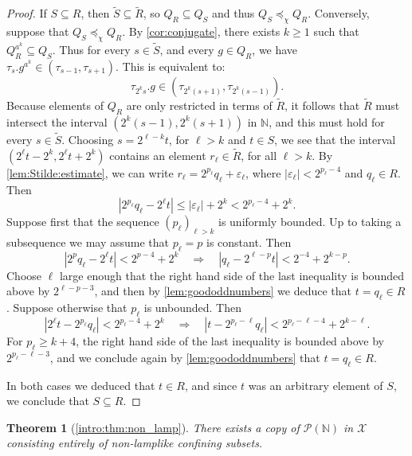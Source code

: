 \documentclass[reqno,12pt]{amsart}\setcounter{tocdepth}{1}
\newtheorem{theorem}{Theorem}[section]
\theoremstyle{definition}
\newcommand{\N}{\mathbb{N}}
\newcommand{\X}{\mathcal{X}}
\numberwithin{equation}{section}
\begin{document}
\begin{proof}
    If $S \subseteq R$, then $\widetilde{S} \subseteq \widetilde{R}$, so $Q_R \subseteq Q_S$ and thus $Q_S \preceq_\chi Q_R$. Conversely, suppose that $Q_S \preceq_\chi Q_R$. By \cref{cor:conjugate}, there exists $k \geq 1$ such that $Q_R^{a^k} \subseteq Q_S$. Thus for every $s \in \widetilde{S}$, and every $g \in Q_R$, we have $\tau_s.g^{a^k} \in (\tau_{s-1}, \tau_{s+1})$. This is equivalent to:
    \[\tau_{2^ks}.g \in (\tau_{2^k(s+1)}, \tau_{2^k(s-1)}).\]
    Because elements of $Q_R$ are only restricted in terms of $\widetilde{R}$, it follows that $\widetilde{R}$ must intersect the interval $(2^k(s-1), 2^k(s+1))$ in $\N$, and this must hold for every $s \in \widetilde{S}$. Choosing $s = 2^{\ell-k} t$, for $\ell > k$ and $t \in S$, we see that the interval $(2^\ell t - 2^k, 2^\ell t + 2^k)$ contains an element $r_\ell \in \widetilde{R}$, for all $\ell > k$. By \cref{lem:Stilde:estimate}, we can write $r_\ell = 2^{p_\ell} q_\ell + \varepsilon_\ell$, where $|\varepsilon_\ell| < 2^{p_\ell - 4}$ and $q_\ell \in R$. Then
    \[|2^{p_\ell} q_\ell - 2^\ell t| \leq |\varepsilon_\ell| + 2^k < 2^{p_\ell - 4} + 2^k.\]
    Suppose first that the sequence $(p_\ell)_{\ell>k}$ is uniformly bounded. Up to taking a subsequence we may assume that $p_\ell = p$ is constant. Then
    \[|2^p q_\ell - 2^\ell t| < 2^{p - 4} + 2^k \quad\Rightarrow\quad |q_\ell - 2^{\ell - p} t| < 2^{-4} + 2^{k-p}.\]
    Choose $\ell$ large enough that the right hand side of the last inequality is bounded above by $2^{\ell - p - 3}$, and then by \cref{lem:goododdnumbers} we deduce that $t = q_\ell \in R$. Suppose otherwise that $p_\ell$ is unbounded. Then
    \[|2^\ell t - 2^{p_\ell} q_\ell| < 2^{p_\ell - 4} + 2^k \quad\Rightarrow\quad |t - 2^{p_\ell - \ell} q_\ell| < 2^{p_\ell - \ell - 4} + 2^{k-\ell}.\]
    For $p_\ell \geq k + 4$, the right hand side of the last inequality is bounded above by $2^{p_\ell - \ell - 3}$, and we conclude again by \cref{lem:goododdnumbers} that $t = q_\ell \in R$.
    
    In both cases we deduced that $t \in R$, and since $t$ was an arbitrary element of $S$, we conclude that $S \subseteq R$.
\end{proof}

\begin{theorem}[\cref{intro:thm:non_lamp}]\label{thm:non_lamp}
There exists a copy of $\mathcal{P}(\N)$ in $\X$ consisting entirely of non-lamplike confining subsets.
\end{theorem}
\end{document}
